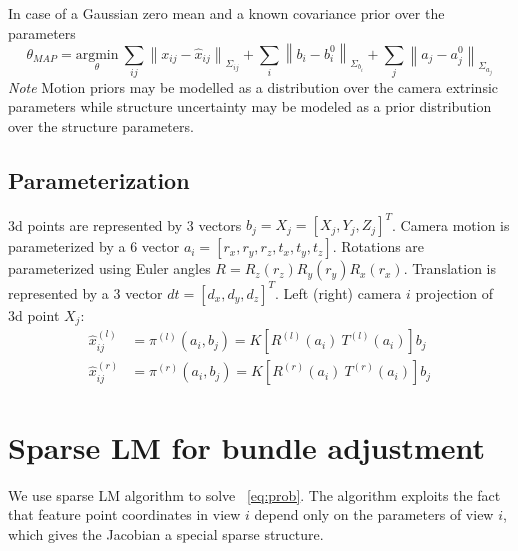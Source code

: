 \documentclass[10pt]{article}         %
\begin{document}
In case of a Gaussian zero mean and a known covariance  prior over the parameters
\[
\theta_{MAP} = \underset{\theta}{\text{argmin}}\ \sum_{ij}\left\|
  x_{ij}-\hat{x}_{ij}\right\|_{\Sigma_{ij}} + \sum_i
\left\|b_i-b_i^0\right\|_{\Sigma_{b_i}} + \sum_j\left\|a_j-a_j^0\right\|_{\Sigma_{a_j}}
\]
\emph{Note} Motion priors may be modelled as a distribution over
the camera extrinsic parameters while structure uncertainty may be
modeled as a prior distribution over the structure parameters.

\subsection{Parameterization}

3d points are represented by 3 vectors $b_j = X_j = [X_j,Y_j,Z_j]^T$.
Camera motion is parameterized by a 6 vector
$a_i = [r_x,r_y,r_z,t_x,t_y,t_z]$.  Rotations are parameterized using
Euler angles $ R = R_z(r_z)R_y(r_y)R_x(r_x)$.  Translation is
represented by a 3 vector $ dt = [d_x,d_y,d_z]^T$. Left (right) camera
$i$ projection of 3d point $X_j$:
$$
\begin{aligned}
  \hat{x}^{(l)}_{ij} &= \pi^{(l)}(a_i,b_j) = K[R^{(l)}(a_i)\ T^{(l)}(a_i)]b_j\\
  \hat{x}^{(r)}_{ij} &= \pi^{(r)}(a_i,b_j) = K[R^{(r)}(a_i)\
  T^{(r)}(a_i)]b_j
\end{aligned}
$$

\section{Sparse LM for bundle adjustment}

We use sparse LM algorithm to solve ~\ref{eq:prob}. The algorithm
exploits the fact that feature point coordinates in view $i$ depend
only on the parameters of view $i$, which gives the Jacobian a special
sparse structure.
\end{document}
